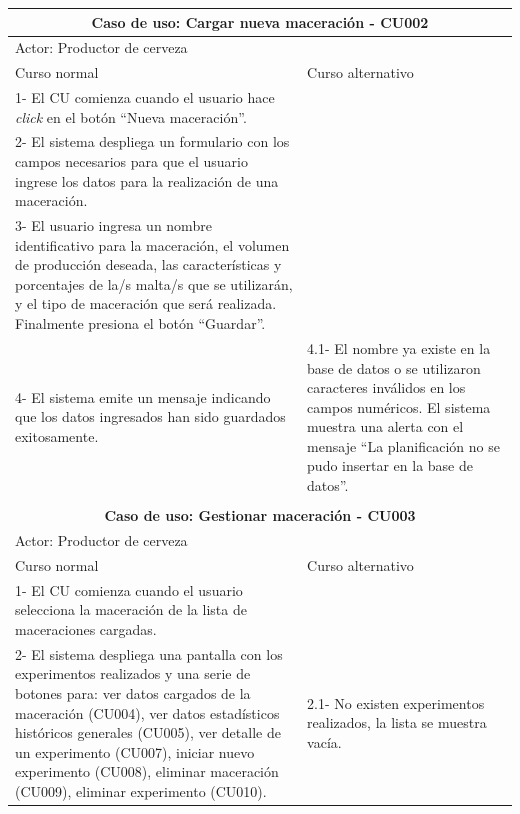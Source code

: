 \begin{longtable}{|p{7cm}|p{7cm}|}
        \hline
        \multicolumn{2}{|c|}{\textbf{Caso de uso: Cargar nueva maceración - CU002}} \\
        \hline
        \multicolumn{2}{|l|}{Actor: Productor de cerveza} \\
        \hline
        Curso normal & Curso alternativo \\
        \hline
        1- El CU comienza cuando el usuario hace \textit{click} en el botón “Nueva maceración”. & \\
        \hline
        2- El sistema despliega un formulario con los campos necesarios para que el usuario ingrese los datos para la realización de una maceración. &
        \\
        \hline
        3- El usuario ingresa un nombre identificativo para la maceración, el volumen de producción deseada, las características y porcentajes de la/s malta/s que se utilizarán, y el tipo de maceración que será realizada. Finalmente presiona el botón ``Guardar''. &
        \\
        \hline
        4- El sistema emite un mensaje indicando que los datos ingresados han sido guardados exitosamente.  & 
        4.1- El nombre ya existe en la base de datos o se utilizaron caracteres inválidos en los campos numéricos. El sistema muestra una alerta con el mensaje “La planificación no se pudo insertar en la base de datos”.
        \\
        \hline
        \multicolumn{2}{c}{ }\\
        \hline
        \multicolumn{2}{|c|}{ \textbf{Caso de uso: Gestionar maceración - CU003}}\\
        \hline
        \multicolumn{2}{|l|}{Actor: Productor de cerveza} \\
        \hline
        Curso normal & Curso alternativo \\
        \hline
        1- El CU comienza cuando el usuario selecciona la maceración de la lista de maceraciones cargadas. & \\
        \hline
        2- El sistema despliega una pantalla con los experimentos realizados y una serie de botones para:  ver datos cargados de la maceración (CU004), ver datos estadísticos históricos generales (CU005), ver detalle de un experimento (CU007), iniciar nuevo experimento (CU008), eliminar maceración (CU009), eliminar experimento (CU010). & 2.1- No existen experimentos realizados, la lista se muestra vacía.
        \\
        \hline
        

\end{longtable}

